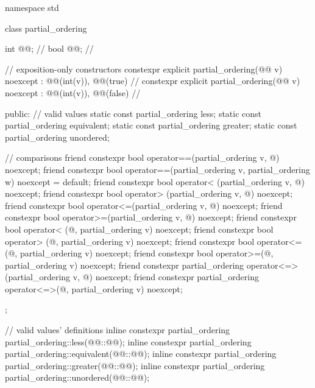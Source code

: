 %
%
%
%
%
\begin{codeblock}
namespace std {
  class partial_ordering {
    int @@;          // \expos
    bool @@;    // \expos

    // exposition-only constructors
    constexpr explicit
      partial_ordering(@@ v) noexcept : @@(int(v)), @@(true) {}     // \expos
    constexpr explicit
      partial_ordering(@@ v) noexcept : @@(int(v)), @@(false) {}   // \expos

  public:
    // valid values
    static const partial_ordering less;
    static const partial_ordering equivalent;
    static const partial_ordering greater;
    static const partial_ordering unordered;

    // comparisons
    friend constexpr bool operator==(partial_ordering v, @\unspec@) noexcept;
    friend constexpr bool operator==(partial_ordering v, partial_ordering w) noexcept = default;
    friend constexpr bool operator< (partial_ordering v, @\unspec@) noexcept;
    friend constexpr bool operator> (partial_ordering v, @\unspec@) noexcept;
    friend constexpr bool operator<=(partial_ordering v, @\unspec@) noexcept;
    friend constexpr bool operator>=(partial_ordering v, @\unspec@) noexcept;
    friend constexpr bool operator< (@\unspec@, partial_ordering v) noexcept;
    friend constexpr bool operator> (@\unspec@, partial_ordering v) noexcept;
    friend constexpr bool operator<=(@\unspec@, partial_ordering v) noexcept;
    friend constexpr bool operator>=(@\unspec@, partial_ordering v) noexcept;
    friend constexpr partial_ordering operator<=>(partial_ordering v, @\unspec@) noexcept;
    friend constexpr partial_ordering operator<=>(@\unspec@, partial_ordering v) noexcept;
  };

  // valid values' definitions
  inline constexpr partial_ordering partial_ordering::less(@@::@@);
  inline constexpr partial_ordering partial_ordering::equivalent(@@::@@);
  inline constexpr partial_ordering partial_ordering::greater(@@::@@);
  inline constexpr partial_ordering partial_ordering::unordered(@@::@@);
}
\end{codeblock}

